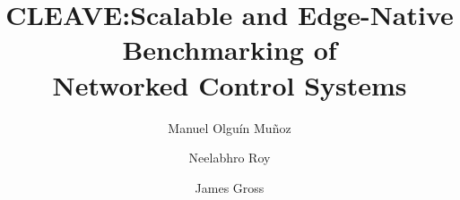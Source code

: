 \documentclass[sigconf,10pt,natbib=false,nonacm=true]{acmart}
\title[CLEAVE]{CLEAVE:\@ Scalable and Edge-Native Benchmarking of\\{Networked Control Systems}}
\author{Manuel {Olguín Muñoz}}
\affiliation{%
\institution{KTH Royal Institute of Technology}%
\city{Stockholm}%
\country{Sweden}%
}
\author{Neelabhro Roy}
\affiliation{%
\institution{KTH Royal Institute of Technology}%
\city{Stockholm}%
\country{Sweden}%
}
\author{James Gross}
\affiliation{%
\institution{KTH Royal Institute of Technology}%
\city{Stockholm}%
\country{Sweden}%
}
\begin{document}
\maketitle
\renewcommand{\shortauthors}{{Olguín Muñoz} et al.}






\printbibliography{}
\end{document}
